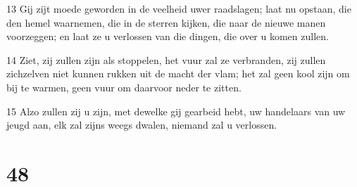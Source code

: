 \par 13 Gij zijt moede geworden in de veelheid uwer raadslagen; laat nu opstaan, die den hemel waarnemen, die in de sterren kijken, die naar de nieuwe manen voorzeggen; en laat ze u verlossen van die dingen, die over u komen zullen.
\par 14 Ziet, zij zullen zijn als stoppelen, het vuur zal ze verbranden, zij zullen zichzelven niet kunnen rukken uit de macht der vlam; het zal geen kool zijn om bij te warmen, geen vuur om daarvoor neder te zitten.
\par 15 Alzo zullen zij u zijn, met dewelke gij gearbeid hebt, uw handelaars van uw jeugd aan, elk zal zijns weegs dwalen, niemand zal u verlossen.

\chapter{48}

